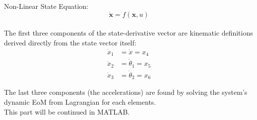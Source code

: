 \documentclass[12pt]{article}
\begin{document}
	Non-Linear State Equation:\\
	\begin{equation}
		\dot{\mathbf{x}} = f(\mathbf{x}, u)
	\end{equation}\\


	The first three components of the state-derivative vector are kinematic definitions derived directly from the state vector itself:
		\begin{align*}
			\dot{x}_1 &= \dot{x} = x_4 \\
			\dot{x}_2 &= \dot{\theta}_1 = x_5 \\
			\dot{x}_3 &= \dot{\theta}_2 = x_6
		\end{align*}




	The last three components (the accelerations) are found by solving the system's dynamic EoM from Lagrangian for each elements.\\
	This part will be continued in MATLAB.
	
\end{document}
